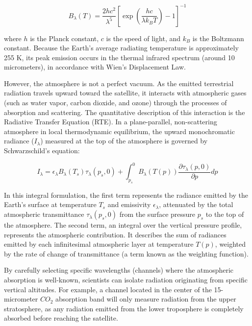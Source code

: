 \begin{equation}
B_\lambda(T) = \frac{2hc^2}{\lambda^5} \left[ \exp\left(\frac{hc}{\lambda k_B T}\right) - 1 \right]^{-1}
\end{equation}

where $h$ is the Planck constant, $c$ is the speed of light, and $k_B$ is the Boltzmann constant. Because the Earth's average radiating temperature is approximately 255 K, its peak emission occurs in the thermal infrared spectrum (around 10 micrometers), in accordance with Wien's Displacement Law.

However, the atmosphere is not a perfect vacuum. As the emitted terrestrial radiation travels upward toward the satellite, it interacts with atmospheric gases (such as water vapor, carbon dioxide, and ozone) through the processes of absorption and scattering. The quantitative description of this interaction is the Radiative Transfer Equation (RTE). In a plane-parallel, non-scattering atmosphere in local thermodynamic equilibrium, the upward monochromatic radiance ($I_\lambda$) measured at the top of the atmosphere is governed by Schwarzschild's equation:

\begin{equation}
I_\lambda = \epsilon_\lambda B_\lambda(T_s) \tau_\lambda(p_s, 0) + \int_{p_s}^{0} B_\lambda(T(p)) \frac{\partial \tau_\lambda(p, 0)}{\partial p} dp
\end{equation}

In this integral formulation, the first term represents the radiance emitted by the Earth's surface at temperature $T_s$ and emissivity $\epsilon_\lambda$, attenuated by the total atmospheric transmittance $\tau_\lambda(p_s, 0)$ from the surface pressure $p_s$ to the top of the atmosphere. The second term, an integral over the vertical pressure profile, represents the atmospheric contribution. It describes the sum of radiances emitted by each infinitesimal atmospheric layer at temperature $T(p)$, weighted by the rate of change of transmittance (a term known as the weighting function). 

By carefully selecting specific wavelengths (channels) where the atmospheric absorption is well-known, scientists can isolate radiation originating from specific vertical altitudes. For example, a channel located in the center of the 15-micrometer $CO_2$ absorption band will only measure radiation from the upper stratosphere, as any radiation emitted from the lower troposphere is completely absorbed before reaching the satellite.

